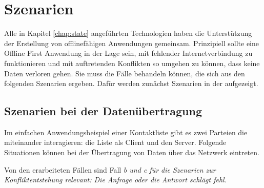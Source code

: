\chapter{\label{chap:szenarien}Szenarien}
Alle in Kapitel \ref{chap:state} angeführten Technologien haben die Unterstützung der Erstellung von offlinefähigen Anwendungen gemeinsam.
Prinzipiell sollte eine Offline First Anwendung in der Lage sein, mit fehlender Internetverbindung zu funktionieren und mit auftretenden Konflikten so umgehen zu können, dass keine Daten verloren gehen.
Sie muss die Fälle behandeln können, die sich aus den folgenden Szenarien ergeben.
Dafür werden zunächst Szenarien in der  aufgezeigt.
%
%
%
\section{\label{sec:netszenarien}Szenarien bei der Datenübertragung}
Im einfachen Anwendungsbeispiel einer Kontaktliste gibt es zwei Parteien die miteinander interagieren: die Liste als Client und den Server. Folgende Situationen können bei der Übertragung von Daten über das Netzwerk eintreten.

Von den erarbeiteten Fällen sind Fall \it{b} und \it{c} für die Szenarien zur Konfliktentstehung relevant: Die Anfrage oder die Antwort schlägt fehl.
%
%
%
